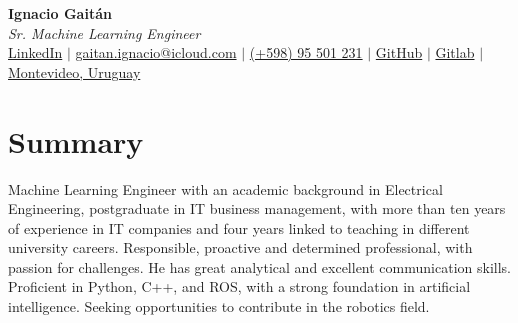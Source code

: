 \documentclass[letterpaper,11pt]{article}
\begin{document}
\begin{center}
    \textbf{\LARGE Ignacio Gaitán} \\ \vspace{2ex}
    \textit{Sr. Machine Learning Engineer} \\ \vspace{2ex}
    \small
    \faLinkedinSquare \hspace{.5pt} \href{https://www.linkedin.com/in/ignacio-gaitan}{LinkedIn}
    $|$
    \faAt \hspace{.5pt} \href{mailto:gaitan.ignacio@icloud.com}{gaitan.ignacio@icloud.com}
    $|$
    \faMobile \hspace{.5pt} \href{tel:+59895501231}{(+598) 95 501 231}
    $|$
    \faGithub \hspace{.5pt} \href{https://github.com/gaitanignacio}{GitHub}
    $|$
    \faGithub \hspace{.5pt} \href{https://gitlab.com/gaitan.ignacio}{Gitlab}
    $|$
    \faMapMarker \hspace{.5pt} \href{https://www.google.com/maps/place/Prof.+Juan+Carlos+Sabat+Pebet+1234,+11300+Montevideo,+Departamento+de+Montevideo,+Uruguay/@-34.9044985,-56.1366609,17z/data=!3m1!4b1!4m6!3m5!1s0x959f813e56b3cedd:0x5a415e79543b2770!8m2!3d-34.9044985!4d-56.134086!16s%2Fg%2F11pysbccyt?entry=ttu}{Montevideo, Uruguay}
\end{center}

\vspace{-2ex}

\section*{Summary}
Machine Learning Engineer with an academic background in Electrical Engineering, postgraduate in IT business management, with more than ten years of experience in IT companies and four years linked to teaching in different university careers. 
Responsible, proactive and determined professional, with passion for challenges. He has great analytical and excellent communication skills. Proficient in Python, C++, and ROS, with a strong foundation in artificial intelligence. 
Seeking opportunities to contribute in the robotics field.
\end{document}
